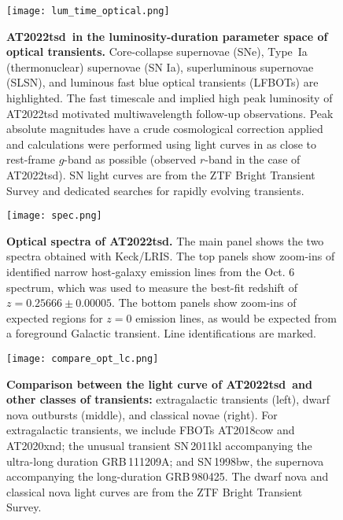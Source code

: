 \documentclass{nature_plusfigure}
\newcommand{\at}{AT2022tsd}
\begin{document}
\clearpage

\begin{extended_data}

\renewcommand{\thefigure}{\arabic{figure}~Extended~Data}
\renewcommand{\thefigure}{Extended Data Figure \arabic{figure}}
\renewcommand{\figurename}{}
\setcounter{figure}{0}

\renewcommand{\thetable}{\arabic{table}~Extended~Data}
\renewcommand{\thetable}{Extended Data Table \arabic{table}}
\renewcommand{\tablename}{}
\setcounter{table}{0}

\begin{figure}[ht]
\centering
\texttt{[image: lum\_time\_optical.png]}
\caption{\textbf{\at\ in the luminosity-duration parameter space of optical transients.} Core-collapse supernovae (SNe), Type~Ia (thermonuclear) supernovae (SN Ia), superluminous supernovae (SLSN), and luminous fast blue optical transients (LFBOTs\cite{Prentice2018,Perley2019,Perley2021,Ho2020_Koala,Yao2022,Coppejans2020}) are highlighted. The fast timescale and implied high peak luminosity of AT2022tsd motivated multiwavelength follow-up observations. Peak absolute magnitudes have a crude cosmological correction applied and calculations were performed using light curves in as close to rest-frame $g$-band as possible (observed $r$-band in the case of \at). SN light curves are from the ZTF Bright Transient Survey\cite{PerleyBTS,FremlingBTS} and dedicated searches for rapidly evolving transients\cite{Ho2022_RET}.}
\label{fig:opt-phase-space}
\end{figure}

\begin{figure}[ht]
 \centering
\texttt{[image: spec.png]}
  \caption{\textbf{Optical spectra of \at.} The main panel shows the two spectra obtained with Keck/LRIS. The top panels show zoom-ins of identified narrow host-galaxy emission lines from the Oct. 6 spectrum, which was used to measure the best-fit redshift of $z=0.25666\pm0.00005$. The bottom panels show zoom-ins of expected regions for $z=0$ emission lines, as would be expected from a foreground Galactic transient. Line identifications are marked.}
 \label{fig:spec}
\end{figure}

\begin{figure}[ht]
 \centering
\texttt{[image: compare\_opt\_lc.png]}
  \caption{\textbf{Comparison between the light curve of \at\ and other classes of transients:} extragalactic transients (left), dwarf nova outbursts (middle), and classical novae (right). For extragalactic transients, we include FBOTs AT2018cow\cite{Perley2019} and AT2020xnd\cite{Perley2021}; the unusual transient SN\,2011kl accompanying the ultra-long duration GRB\,111209A; and SN\,1998bw, the supernova accompanying the long-duration GRB\,980425. The dwarf nova and classical nova light curves are from the ZTF Bright Transient Survey\cite{Perley2020}.}
 \label{fig:opt-lc-comparison}
\end{figure}


\end{extended_data}
\end{document}
